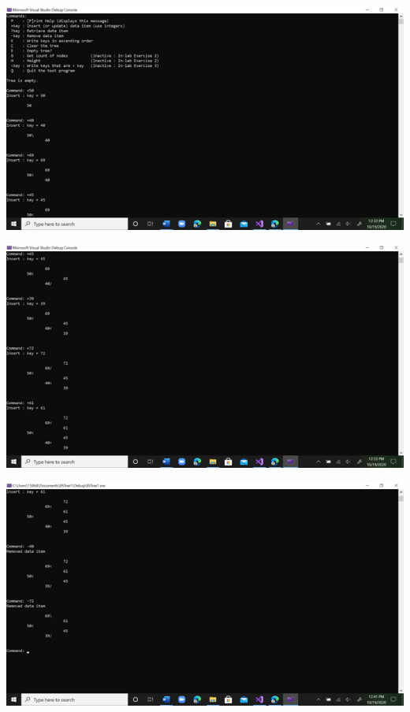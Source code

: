 
\begin{DoxyImageNoCaption}
  \mbox{\includegraphics[width=17cm]{Lab9Test1.1.png}}
\end{DoxyImageNoCaption}



\begin{DoxyImageNoCaption}
  \mbox{\includegraphics[width=17cm]{Lab9Test1.2.png}}
\end{DoxyImageNoCaption}



\begin{DoxyImageNoCaption}
  \mbox{\includegraphics[width=17cm]{Lab9Test1.3.png}}
\end{DoxyImageNoCaption}



